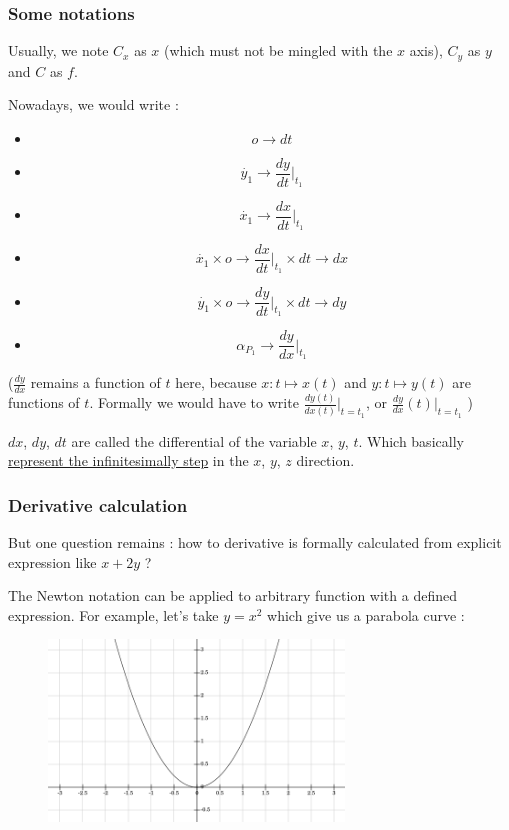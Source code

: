 \documentclass[12pt]{article}
\begin{document}
\subsubsection{Some notations}

Usually, we note $C_x$ as $x$ (which must not be mingled with the $x$ axis), $C_y$ as $y$ and $C$ as $f$.

\bigskip

Nowadays, we would write :

\begin{itemize}
\item $$ o \rightarrow dt $$
\item $$ \dot{y_1} \rightarrow \frac{dy}{dt}|_{t_1} $$
\item $$ \dot{x_1} \rightarrow \frac{dx}{dt}|_{t_1} $$
\item $$ \dot{x_1} \times o \rightarrow \frac{dx}{dt}|_{t_1} \times dt  \rightarrow dx $$
\item $$ \dot{y_1} \times o \rightarrow \frac{dy}{dt}|_{t_1} \times dt  \rightarrow dy $$
\item $$ \alpha_{P_1} \rightarrow \frac{dy}{dx}|_{t_1} $$ 
\end{itemize}

($\frac{dy}{dx}$ remains a function of $t$ here, because $x: t \mapsto x(t)$ and $y: t \mapsto y(t)$ are functions of $t$. Formally we would have to write $\frac{dy(t)}{dx(t)}|_{t=t_1}$, or $\frac{dy}{dx}(t)|_{t=t_1}$ )

$dx$, $dy$, $dt$ are called the differential of the variable $x$, $y$, $t$. Which basically  \href{https://math.stackexchange.com/questions/200393/what-is-dx-in-integration}{represent the infinitesimally step} in the $x$, $y$, $z$ direction. 


\subsubsection{Derivative calculation}


But one question remains : how to derivative is formally calculated from explicit expression like $x + 2y$ ?

The Newton notation can be applied to arbitrary function with a defined expression. For example, let's take $y = x^2$ which give us a parabola curve :

\begin{figure}[H]
\centering
\includegraphics[width=0.7\textwidth]{assets/images/SHTIxCkjCR.png}
\end{figure}
\end{document}
